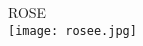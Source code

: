 \documentclass[12pt]{article}
\begin{document}
ROSE \\
\texttt{[image: rosee.jpg]} \\
\end{document}
